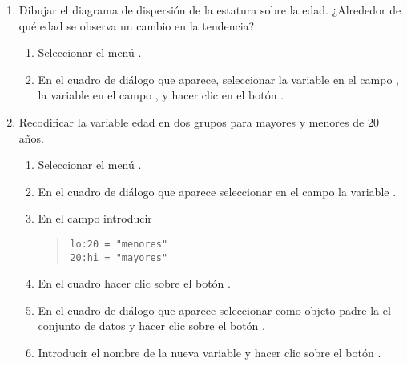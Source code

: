 \begin{enumerate}[leftmargin=*]
\begin{enumerate}
\item Dibujar el diagrama de dispersión de la estatura sobre la edad. 
¿Alrededor de qué edad se observa un cambio en la tendencia? 
\begin{indicacion}
\begin{enumerate}
\item Seleccionar el menú .
\item En el cuadro de diálogo que aparece, seleccionar la variable  en el campo ,
la variable  en el campo , y hacer clic en el botón .
\end{enumerate}
\end{indicacion}

\item Recodificar la variable edad en dos grupos para mayores y menores de 20 años.
\begin{indicacion}
\begin{enumerate}
\item Seleccionar el menú .
\item En el cuadro de diálogo que aparece seleccionar en el campo  la variable
.
\item En el campo  introducir
\begin{quote}
\lstinline{lo:20 = "menores"}\\
\lstinline{20:hi = "mayores"}
\end{quote}
\item En el cuadro  hacer clic sobre el botón .
\item En el cuadro de diálogo que aparece seleccionar como objeto padre la el conjunto de datos  y hacer clic sobre el botón .
\item Introducir el nombre de la nueva variable  y hacer clic sobre el botón .
\end{enumerate}
\end{indicacion}


\end{enumerate}
\end{enumerate}
